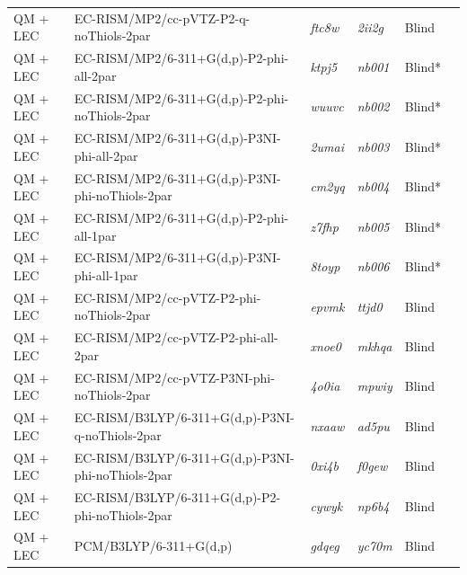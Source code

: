 \documentclass[9pt,lineno,final]{elife}
\begin{document}
\begin{table}
\begin{center}
\begin{threeparttable}
\begin{tabular}{llllll}
QM + LEC & EC-RISM/MP2/cc-pVTZ-P2-q-noThiols-2par & \textit{ftc8w} & \textit{2ii2g} & Blind & \cite{Tielker:2018:J.Comput.AidedMol.Des.} \\
\rowcolor[HTML]{EFEFEF} 
QM + LEC & EC-RISM/MP2/6-311+G(d,p)-P2-phi-all-2par & \textit{ktpj5} & \textit{nb001} & Blind* & \cite{Tielker:2018:J.Comput.AidedMol.Des.} \\
QM + LEC & EC-RISM/MP2/6-311+G(d,p)-P2-phi-noThiols-2par & \textit{wuuvc} & \textit{nb002} & Blind* & \cite{Tielker:2018:J.Comput.AidedMol.Des.} \\
\rowcolor[HTML]{EFEFEF} 
QM + LEC & EC-RISM/MP2/6-311+G(d,p)-P3NI-phi-all-2par & \textit{2umai} & \textit{nb003} & Blind* & \cite{Tielker:2018:J.Comput.AidedMol.Des.} \\
QM + LEC & EC-RISM/MP2/6-311+G(d,p)-P3NI-phi-noThiols-2par & \textit{cm2yq} & \textit{nb004} & Blind* & \cite{Tielker:2018:J.Comput.AidedMol.Des.} \\
\rowcolor[HTML]{EFEFEF} 
QM + LEC & EC-RISM/MP2/6-311+G(d,p)-P2-phi-all-1par & \textit{z7fhp} & \textit{nb005} & Blind* & \cite{Tielker:2018:J.Comput.AidedMol.Des.} \\
QM + LEC & EC-RISM/MP2/6-311+G(d,p)-P3NI-phi-all-1par & \textit{8toyp} & \textit{nb006} & Blind* & \cite{Tielker:2018:J.Comput.AidedMol.Des.} \\
\rowcolor[HTML]{EFEFEF} 
QM + LEC & EC-RISM/MP2/cc-pVTZ-P2-phi-noThiols-2par & \textit{epvmk} & \textit{ttjd0} & Blind & \cite{Tielker:2018:J.Comput.AidedMol.Des.} \\
QM + LEC & EC-RISM/MP2/cc-pVTZ-P2-phi-all-2par & \textit{xnoe0} & \textit{mkhqa} & Blind & \cite{Tielker:2018:J.Comput.AidedMol.Des.} \\
\rowcolor[HTML]{EFEFEF} 
QM + LEC & EC-RISM/MP2/cc-pVTZ-P3NI-phi-noThiols-2par & \textit{4o0ia} & \textit{mpwiy} & Blind & \cite{Tielker:2018:J.Comput.AidedMol.Des.} \\
QM + LEC & EC-RISM/B3LYP/6-311+G(d,p)-P3NI-q-noThiols-2par & \textit{nxaaw} & \textit{ad5pu} & Blind & \cite{Tielker:2018:J.Comput.AidedMol.Des.} \\
\rowcolor[HTML]{EFEFEF} 
QM + LEC & EC-RISM/B3LYP/6-311+G(d,p)-P3NI-phi-noThiols-2par & \textit{0xi4b} & \textit{f0gew} & Blind & \cite{Tielker:2018:J.Comput.AidedMol.Des.} \\
QM + LEC & EC-RISM/B3LYP/6-311+G(d,p)-P2-phi-noThiols-2par & \textit{cywyk} & \textit{np6b4} & Blind & \cite{Tielker:2018:J.Comput.AidedMol.Des.} \\
\rowcolor[HTML]{EFEFEF} 
QM + LEC & PCM/B3LYP/6-311+G(d,p) & \textit{gdqeg} & \textit{yc70m} & Blind & \cite{Tielker:2018:J.Comput.AidedMol.Des.} \\

\end{tabular}
\end{threeparttable}
\end{center}
\end{table}
\end{document}
